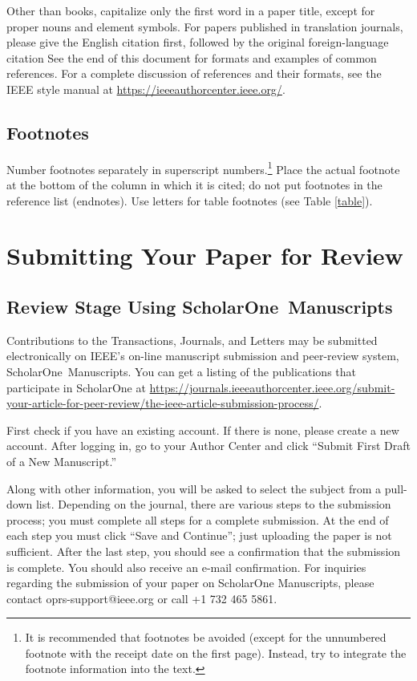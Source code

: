 \documentclass{ieeeojies}
\begin{document}
Other than books, capitalize only the first word in a paper title, except 
for proper nouns and element symbols. For papers published in translation 
journals, please give the English citation first, followed by the original 
foreign-language citation See the end of this document for formats and 
examples of common references. For a complete discussion of references and 
their formats, see the IEEE style manual at
\underline{https://ieeeauthorcenter.ieee.org/}.

\subsection{Footnotes}
Number footnotes separately in superscript numbers.\footnote{It is recommended that footnotes be avoided (except for 
the unnumbered footnote with the receipt date on the first page). Instead, 
try to integrate the footnote information into the text.} Place the actual 
footnote at the bottom of the column in which it is cited; do not put 
footnotes in the reference list (endnotes). Use letters for table footnotes 
(see Table \ref{table}).

\section{Submitting Your Paper for Review}

\subsection{Review Stage Using ScholarOne\textregistered\ Manuscripts}
Contributions to the Transactions, Journals, and Letters may be submitted 
electronically on IEEE's on-line manuscript submission and peer-review 
system, ScholarOne\textregistered\ Manuscripts. You can get a listing of the 
publications that participate in ScholarOne at 
\underline{https://journals.ieeeauthorcenter.ieee.org/submit-your-article-}\break\underline{for-peer-review/the-ieee-article-submission-process/}.

First check if you have an existing account. If there is none, please create 
a new account. After logging in, go to your Author Center and click ``Submit 
First Draft of a New Manuscript.'' 

Along with other information, you will be asked to select the subject from a 
pull-down list. Depending on the journal, there are various steps to the 
submission process; you must complete all steps for a complete submission. 
At the end of each step you must click ``Save and Continue''; just uploading 
the paper is not sufficient. After the last step, you should see a 
confirmation that the submission is complete. You should also receive an 
e-mail confirmation. For inquiries regarding the submission of your paper on 
ScholarOne Manuscripts, please contact oprs-support@ieee.org or call +1 732 
465 5861.
\end{document}
